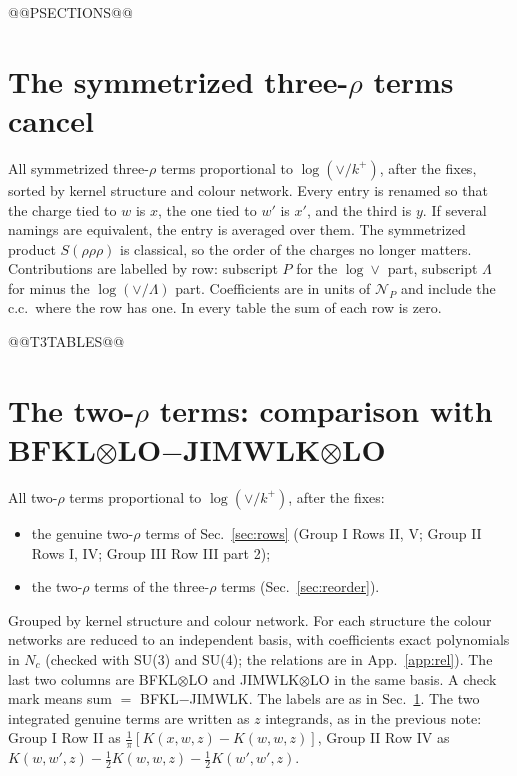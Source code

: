 \documentclass[10pt]{article}
\numberwithin{equation}{section}
\newcommand{\NP}{\mathcal N_{P}}
\begin{document}
@@PSECTIONS@@

\section{The symmetrized three-\texorpdfstring{$\rho$}{rho} terms cancel}\label{sec:three}
All symmetrized three-$\rho$ terms proportional to $\log(\vee/k^+)$, after the fixes, sorted by kernel structure and colour network. Every entry is renamed so that the charge tied to $w$ is $x$, the one tied to $w'$ is $x'$, and the third is $y$. If several namings are equivalent, the entry is averaged over them. The symmetrized product $S(\rho\rho\rho)$ is classical, so the order of the charges no longer matters. Contributions are labelled by row: subscript $P$ for the $\log\vee$ part, subscript $\Lambda$ for minus the $\log(\vee/\Lambda)$ part. Coefficients are in units of $\NP$ and include the c.c.\ where the row has one. In every table the sum of each row is zero.

@@T3TABLES@@

\section{The two-\texorpdfstring{$\rho$}{rho} terms: comparison with BFKL\texorpdfstring{$\otimes$}{x}LO\texorpdfstring{$-$}{-}JIMWLK\texorpdfstring{$\otimes$}{x}LO}\label{sec:two}
All two-$\rho$ terms proportional to $\log(\vee/k^+)$, after the fixes:
\begin{itemize}
\item the genuine two-$\rho$ terms of Sec.~\ref{sec:rows} (Group I Rows II, V; Group II Rows I, IV; Group III Row III part 2);
\item the two-$\rho$ terms of the three-$\rho$ terms (Sec.~\ref{sec:reorder}).
\end{itemize}
Grouped by kernel structure and colour network. For each structure the colour networks are reduced to an independent basis, with coefficients exact polynomials in $N_c$ (checked with SU(3) and SU(4); the relations are in App.~\ref{app:rel}). The last two columns are BFKL$\otimes$LO and JIMWLK$\otimes$LO in the same basis. A check mark means sum $=$ BFKL$-$JIMWLK. The labels are as in Sec.~\ref{sec:three}. The two integrated genuine terms are written as $z$ integrands, as in the previous note: Group I Row II as $\frac1\pi[K(x,w,z)-K(w,w,z)]$, Group II Row IV as $K(w,w',z)-\frac12K(w,w,z)-\frac12K(w',w',z)$.
\end{document}
